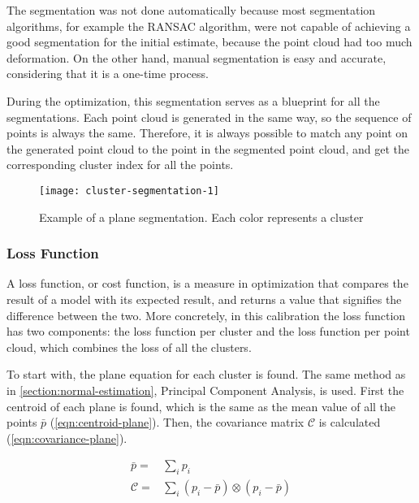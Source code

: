 The segmentation was not done automatically because most segmentation algorithms, for example the RANSAC algorithm, were not capable of achieving a good segmentation for the initial estimate, because the point cloud had too much deformation. On the other hand, manual segmentation is easy and accurate, considering that it is a one-time process.

During the optimization, this segmentation serves as a blueprint for all the segmentations. Each point cloud is generated in the same way, so the sequence of points is always the same. Therefore, it is always possible to match any point on the generated point cloud to the point in the segmented point cloud, and get the corresponding cluster index for all the points.

\begin{figure}[h]
    \centering
    \texttt{[image: cluster-segmentation-1]}
    \caption{Example of a plane segmentation. Each color represents a cluster}
    \label{figure:cluster-segmentation-1}
\end{figure}

\subsubsection{Loss Function}

A loss function, or cost function, is a measure in optimization that compares the result of a model with its expected result, and returns a value that signifies the difference between the two. More concretely, in this calibration the loss function has two components: the loss function per cluster and the loss function per point cloud, which combines the loss of all the clusters. 

To start with, the plane equation for each cluster is found. The same method as in \cref{section:normal-estimation}, Principal Component Analysis, is used. First the centroid of each plane is found, which is the same as the mean value of all the points $\bar{p}$ (\cref{eqn:centroid-plane}). Then, the covariance matrix $\mathcal{C}$ is calculated (\cref{eqn:covariance-plane}).

\begin{align}
    \bar{p} = & \sum_{i}{p_i}
        \label{eqn:centroid-plane} \\
    \mathcal{C} = & \sum_{i}{(p_i - \bar{p}) \otimes (p_i - \bar{p})}
        \label{eqn:covariance-plane}
\end{align}

